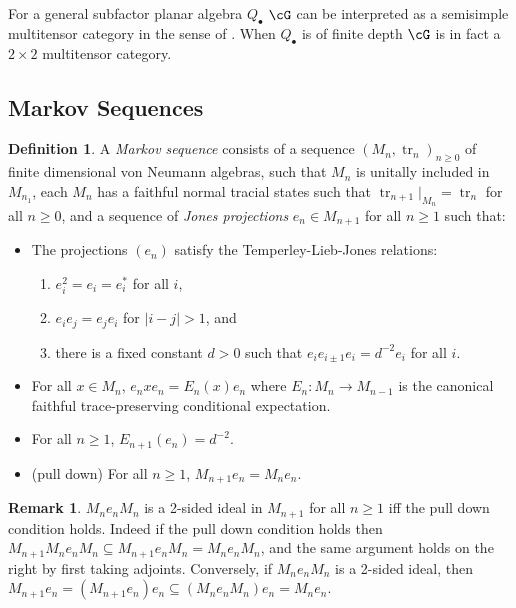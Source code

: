 \documentclass[11pt]{article}
\theoremstyle{plain}
\theoremstyle{definition}
\newtheorem{defn}[thm]{Definition}
\newtheorem{rem}[thm]{Remark}
\DeclareMathOperator{\tr}{tr}
\begin{document}
For a general subfactor planar algebra $Q_{\bullet}$ $\cG$ can be interpreted as a semisimple multitensor category in the sense of \cite{egno}. When $Q_{\bullet}$ is of finite depth $\cG$ is in fact a $2\times 2$ multitensor category.
\subsection{Markov Sequences}


\begin{defn}
A \emph{Markov sequence} consists of a sequence $(M_n, \tr_n)_{n\geq 0}$ of finite dimensional von Neumann algebras, such that $M_n$ is unitally included in $M_{n_1}$, each $M_n$ has a faithful normal tracial states such that $\tr_{n+1}|_{M_n} = \tr_n$ for all $n\geq 0$, and a sequence of \emph{Jones projections} $e_n \in M_{n+1}$ for all $n\geq 1$ such that:
\begin{itemize}
\item
The projections $(e_n)$ satisfy the Temperley-Lieb-Jones relations:
\begin{enumerate}[(1)]
\item
$e_i^2 = e_i = e_i^*$ for all $i$,
\item
$e_i e_j = e_j e_i$ for $|i-j|>1$, and
\item
there is a fixed constant $d>0$ such that $e_{i} e_{i\pm 1} e_i = d^{-2} e_i$ for all $i$.
\end{enumerate}
\item
For all $x\in M_n$, $e_n x e_n = E_n(x)e_n$ where $E_n: M_n \to M_{n-1}$ is the canonical faithful trace-preserving conditional expectation.
\item
For all $n\geq 1$, $E_{n+1}(e_n) = d^{-2}$.
\item
(pull down)
For all $n\geq 1$, $M_{n+1}e_n = M_n e_n$.

\end{itemize}
\end{defn}


\begin{rem}
$M_n e_n M_n$ is a 2-sided ideal in $M_{n+1}$ for all $n\geq 1$ iff the pull down condition holds. Indeed if the pull down condition holds then $M_{n+1} M_n e_n M_n \subseteq M_{n+1} e_n M_n = M_n e_n M_n$, and the same argument holds on the right by first taking adjoints. Conversely, if $M_n e_n M_n$ is a 2-sided ideal, then $M_{n+1} e_n = (M_{n+1} e_n)e_n \subseteq (M_n e_n M_n) e_n = M_n e_n$.
\end{rem}
\end{document}
